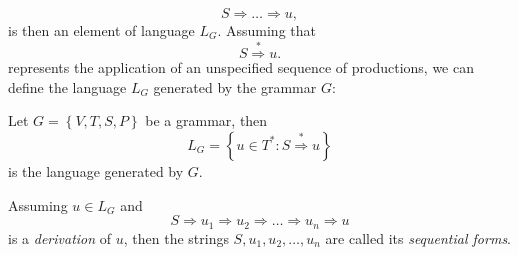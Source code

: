 \begin{equation}
	S \Rightarrow \dots \Rightarrow u,
\end{equation}
is then an element of language $L_G$.
Assuming that 
\begin{equation}
	S \overset{*}{\Rightarrow} u.
\end{equation}
represents the application of an unspecified sequence of productions, we can define the language $L_G$ generated by the grammar $G$:
\begin{definition}[Language]\label{def:language}
	Let $G = \left\{V, T, S, P\right\}$ be a grammar, then
	\begin{equation}
		L_G = \left\{u \in T^* : S \overset{*}{\Rightarrow} u\right\}
	\end{equation}
is the language generated by $G$.
\end{definition}
Assuming $u \in L_G$ and 
\begin{equation}
	S \Rightarrow u_1 \Rightarrow u_2 \Rightarrow \dots \Rightarrow u_n \Rightarrow u
\end{equation}
is a \emph{derivation} of $u$, then the strings $S, u_1, u_2, \dots, u_n$ are called its \emph{sequential forms}.
